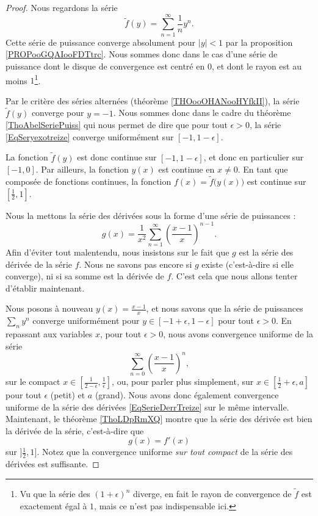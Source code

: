 \begin{proof}
	Nous regardons la série
	\begin{equation}		\label{EqSeryexotreize}
		\tilde f(y)=\sum_{n=1}^{\infty}\frac{1}{ n }y^n.
	\end{equation}
	Cette série de puissance converge absolument pour \( | y |<1\) par la proposition \ref{PROPooGQAIooFDTtrc}. Nous sommes donc dans le cas d'une série de puissance dont le disque de convergence est centré en \( 0\), et dont le rayon est au moins \( 1\)\footnote{Vu que la série des \( (1+\epsilon)^n\)  diverge, en fait le rayon de convergence de \( \tilde  f\) est exactement égal à \( 1\), mais ce n'est pas indispensable ici.}.

	Par le critère des séries alternées (théorème \ref{THOooOHANooHYfkII}), la série \( \tilde f(y) \)  converge pour \( y=-1\). Nous sommes donc dans le cadre du théorème \ref{ThoAbelSeriePuiss} qui nous permet de dire que pour tout \( \epsilon>0\), la série \eqref{EqSeryexotreize} converge uniformément sur \( [-1,1-\epsilon]\).

	La fonction \( \tilde f(y)\) est donc continue sur \( [-1,1-\epsilon]\), et donc en particulier sur \( [-1,0]\). Par ailleurs, la fonction \( y(x)\) est continue en \( x\neq 0\). En tant que composée de fonctions continues, la fonction \( f(x)=\tilde f\big( y(x) \big)\) est continue sur \( [\frac{ 1 }{2},1]\).

	Nous la mettons la série des dérivées sous la forme d'une série de puissances :
	\begin{equation}		\label{EqSerieDerrTreize}
		g(x)=\frac{1}{ x^2 }\sum_{n=1}^{\infty} \left( \frac{ x-1 }{ x } \right)^{n-1}.
	\end{equation}
	Afin d'éviter tout malentendu, nous insistons sur le fait que \( g\) est la série des dérivée de la série \( f\). Nous ne savons pas encore si \( g\) existe (c'est-à-dire si elle converge), ni si sa somme est la dérivée de \( f\). C'est cela que nous allons tenter d'établir maintenant.

	Nous posons à nouveau \( y(x)=\frac{ x-1 }{ x }\), et nous savons que la série de puissances \( \sum_ny^n\) converge uniformément pour \( y\in[-1+\epsilon,1-\epsilon]\) pour tout \( \epsilon>0\). En repassant aux variables \( x\), pour tout \( \epsilon>0\), nous avons convergence uniforme de la série
	\begin{equation}
		\sum_{n=0}^{\infty} \left( \frac{ x-1 }{ x } \right)^n,
	\end{equation}
	sur le compact \( x\in[\frac{ 1 }{ 2-\epsilon },\frac{1}{ \epsilon }]\), ou, pour parler plus simplement, sur \( x\in[\frac{ 1 }{2}+\epsilon,a]\) pour tout \( \epsilon\) (petit) et \( a\) (grand). Nous avons donc également convergence uniforme de la série des dérivées \eqref{EqSerieDerrTreize} sur le même intervalle. Maintenant, le théorème \ref{ThoLDpRmXQ} montre que la série des dérivée est bien la dérivée de la série, c'est-à-dire que
	\begin{equation}
		g(x)=f'(x)
	\end{equation}
	sur \( ]\frac{ 1 }{ 2 },1]\). Notez que la convergence uniforme \emph{sur tout compact} de la série des dérivées est suffisante.


\end{proof}
